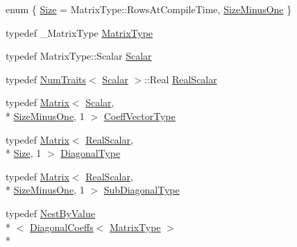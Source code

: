 \begin{DoxyCompactItemize}
\item 
enum \{ \hyperlink{class_hessenberg_decomposition_a66c0a2c644571e4a7b784c7738a81f9dade9123ba4fb314e91b3cde74953dcf95}{Size} = Matrix\-Type\-:\-:Rows\-At\-Compile\-Time, 
\hyperlink{class_hessenberg_decomposition_a66c0a2c644571e4a7b784c7738a81f9dae787f92f691d17275bfc8b3c49d4f1ea}{Size\-Minus\-One}
 \}
\item 
typedef \-\_\-\-Matrix\-Type \hyperlink{class_hessenberg_decomposition_a9ecabc0c14a42b62ef12497bd48a0d44}{Matrix\-Type}
\item 
typedef Matrix\-Type\-::\-Scalar \hyperlink{class_hessenberg_decomposition_a9120e4a5dcb0f620b221f4f7e5704153}{Scalar}
\item 
typedef \hyperlink{struct_num_traits}{Num\-Traits}$<$ \hyperlink{class_hessenberg_decomposition_a9120e4a5dcb0f620b221f4f7e5704153}{Scalar} $>$\-::Real \hyperlink{class_hessenberg_decomposition_a95dd7eea0ca8267932892259b23ac7a9}{Real\-Scalar}
\item 
typedef \hyperlink{class_matrix}{Matrix}$<$ \hyperlink{class_hessenberg_decomposition_a9120e4a5dcb0f620b221f4f7e5704153}{Scalar}, \\*
\hyperlink{class_hessenberg_decomposition_a66c0a2c644571e4a7b784c7738a81f9dae787f92f691d17275bfc8b3c49d4f1ea}{Size\-Minus\-One}, 1 $>$ \hyperlink{class_hessenberg_decomposition_a7ebc295c989226902bae1b525c54e30c}{Coeff\-Vector\-Type}
\item 
typedef \hyperlink{class_matrix}{Matrix}$<$ \hyperlink{class_hessenberg_decomposition_a95dd7eea0ca8267932892259b23ac7a9}{Real\-Scalar}, \\*
\hyperlink{class_hessenberg_decomposition_a66c0a2c644571e4a7b784c7738a81f9dade9123ba4fb314e91b3cde74953dcf95}{Size}, 1 $>$ \hyperlink{class_hessenberg_decomposition_adf12c2ec893935345228cc508c8bb4b3}{Diagonal\-Type}
\item 
typedef \hyperlink{class_matrix}{Matrix}$<$ \hyperlink{class_hessenberg_decomposition_a95dd7eea0ca8267932892259b23ac7a9}{Real\-Scalar}, \\*
\hyperlink{class_hessenberg_decomposition_a66c0a2c644571e4a7b784c7738a81f9dae787f92f691d17275bfc8b3c49d4f1ea}{Size\-Minus\-One}, 1 $>$ \hyperlink{class_hessenberg_decomposition_a9f0a958d44cd3eab363e733c98790ae9}{Sub\-Diagonal\-Type}
\item 
typedef \hyperlink{class_nest_by_value}{Nest\-By\-Value}\\*
$<$ \hyperlink{class_diagonal_coeffs}{Diagonal\-Coeffs}$<$ \hyperlink{class_hessenberg_decomposition_a9ecabc0c14a42b62ef12497bd48a0d44}{Matrix\-Type} $>$\\*

\end{DoxyCompactItemize}

